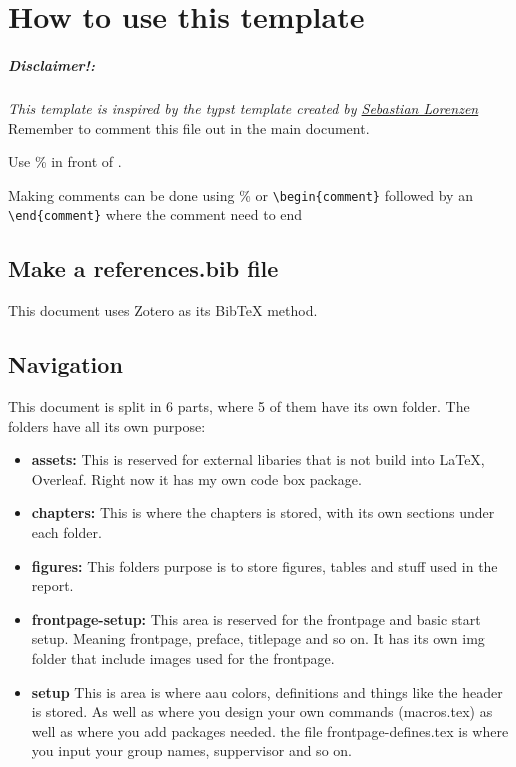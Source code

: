 \chapter*{How to use this template}
\paragraph{Disclaimer!:}\textit{This template is inspired by the typst template created by \href{https://github.com/Naitsabot/AAU-Typst-Template}{Sebastian Lorenzen}}\\

Remember to comment this file out in the main document.

Use \% in front of \verb||.

Making comments can be done using \% or \verb|\begin{comment}| followed by an \\\verb|\end{comment}| where the comment need to end

\section{Make a references.bib file}

This document uses Zotero as its BibTeX method.


\section{Navigation}
This document is split in 6 parts, where 5 of them have its own folder.
The folders have all its own purpose:
\begin{itemize}
    \item \textbf{assets:}
        This is reserved for external libaries that is not build into LaTeX, Overleaf. Right now it has my own code box package.
    \item \textbf{chapters:}
        This is where the chapters is stored, with its own sections under each folder.
    \item \textbf{figures:}
        This folders purpose is to store figures, tables and stuff used in the report. 
    \item \textbf{frontpage-setup:}
        This area is reserved for the frontpage and basic start setup. Meaning frontpage, preface, titlepage and so on. It has its own img folder that include images used for the frontpage.
    \item \textbf{setup}
        This is area is where aau colors, definitions and things like the header is stored. As well as where you design your own commands (macros.tex) as well as where you add packages needed.
        the file frontpage-defines.tex is where you input your group names, suppervisor and so on.
\end{itemize}


